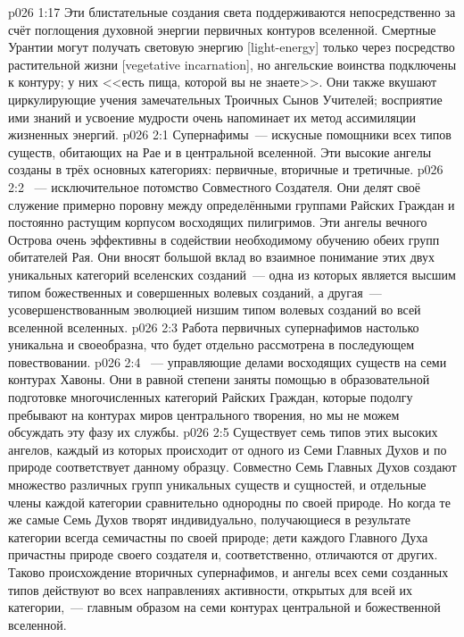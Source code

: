 \vs p026 1:17 Эти блистательные создания света поддерживаются непосредственно за счёт поглощения духовной энергии первичных контуров вселенной. Смертные Урантии могут получать световую энергию [light\hyp{}energy] только через посредство растительной жизни [vegetative incarnation], но ангельские воинства подключены к контуру; у них <<есть пища, которой вы не знаете>>. Они также вкушают циркулирующие учения замечательных Троичных Сынов Учителей; восприятие ими знаний и усвоение мудрости очень напоминает их метод ассимиляции жизненных энергий.
\vs p026 2:1 Супернафимы~--- искусные помощники всех типов существ, обитающих на Рае и в центральной вселенной. Эти высокие ангелы созданы в трёх основных категориях: первичные, вторичные и третичные.
\vs p026 2:2 \pc {}~--- исключительное потомство Совместного Создателя. Они делят своё служение примерно поровну между определёнными группами Райских Граждан и постоянно растущим корпусом восходящих пилигримов. Эти ангелы вечного Острова очень эффективны в содействии необходимому обучению обеих групп обитателей Рая. Они вносят большой вклад во взаимное понимание этих двух уникальных категорий вселенских созданий~--- одна из которых является высшим типом божественных и совершенных волевых созданий, а другая~--- усовершенствованным эволюцией низшим типом волевых созданий во всей вселенной вселенных.
\vs p026 2:3 \pc Работа первичных супернафимов настолько уникальна и своеобразна, что будет отдельно рассмотрена в последующем повествовании.
\vs p026 2:4 \pc {}~--- управляющие делами восходящих существ на семи контурах Хавоны. Они в равной степени заняты помощью в образовательной подготовке многочисленных категорий Райских Граждан, которые подолгу пребывают на контурах миров центрального творения, но мы не можем обсуждать эту фазу их службы.
\vs p026 2:5 \pc Существует семь типов этих высоких ангелов, каждый из которых происходит от одного из Семи Главных Духов и по природе соответствует данному образцу. Совместно Семь Главных Духов создают множество различных групп уникальных существ и сущностей, и отдельные члены каждой категории сравнительно однородны по своей природе. Но когда те же самые Семь Духов творят индивидуально, получающиеся в результате категории всегда семичастны по своей природе; дети каждого Главного Духа причастны природе своего создателя и, соответственно, отличаются от других. Таково происхождение вторичных супернафимов, и ангелы всех семи созданных типов действуют во всех направлениях активности, открытых для всей их категории,~--- главным образом на семи контурах центральной и божественной вселенной.
